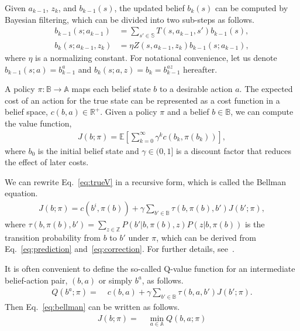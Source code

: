 \documentclass[letterpaper, 10 pt, conference]{ieeeconf}  %
\begin{document}
Given $a_{k-1}$, $z_k$, and $b_{k-1}(s)$,
the updated belief $b_k(s)$ can be computed by Bayesian filtering, which can be divided into two sub-steps as follows.
\begin{align}
  b_{k-1}(s; a_{k-1}) &= \sum_{s' \in \mathbb{S}} T(s, a_{k-1}, s') b_{k-1}(s),
  \label{eq:prediction}
  \\
  b_k(s; a_{k-1}, z_k) &= \eta Z(s, a_{k-1}, z_k) b_{k-1}(s; a_{k-1}),
  \label{eq:correction}
\end{align}
where $\eta$ is a normalizing constant.
For notational convenience, let us denote $b_{k-1}(s; a) = b_{k-1}^a$ and $b_k(s; a, z) = b_k = b_{k-1}^{a z}$ hereafter.

A policy $\pi : \mathbb{B} \rightarrow \mathbb{A}$ maps each belief state $b$ to a desirable action $a$.
The expected cost of an action for the true state can be represented as a cost function in a belief space, $c(b, a) \in \mathbb{R}^+$.
Given a policy $\pi$ and a belief $b \in \mathbb{B}$, we can compute the value function,
\begin{align}
  J(b; \pi) %
  = \mathbb{E} \left[ \sum_{k=0}^\infty \gamma^k c(b_k, \pi(b_k)) \right]\!,
  \label{eq:trueV}
\end{align}
where $b_0$ is the initial belief state and 	$\gamma \in (0, 1]$ is a discount factor that reduces the effect of later costs.


We can rewrite Eq.~\ref{eq:trueV} in a recursive form, which is called the Bellman equation.
\begin{align}
J(b; \pi) = c(b^i, \pi(b)) %
   + \gamma \sum_{b' \in \mathbb{B}} \tau(b, \pi(b), b') J(b'; \pi),
  \label{eq:bellman}
\end{align}
where $\tau(b, \pi(b), b') = \sum_{z \in \mathbb{Z}} P(b'|b,\pi(b),z) P(z|b,\pi(b))$ is the transition probability from $b$ to $b'$ under $\pi$,
which can be derived from Eq.~\ref{eq:prediction} and~\ref{eq:correction}.
For further details, see~\cite{Ross08}.

It is often convenient to define the so-called Q-value function for an intermediate belief-action pair, $(b, a)$ or simply $b^a$, as follows.
\begin{align}
  Q(b^a; \pi) =\; & c(b, a) + \gamma \sum_{b' \in \mathbb{B}} \tau(b, a, b') J(b'; \pi).
  \label{eq:qfunction}
\end{align}
Then Eq.~\ref{eq:bellman} can be written as follows.
\begin{align}
J(b; \pi) =\; & \min_{a \in \mathbb{A}} Q(b, a; \pi)
\label{eq:minq}
\end{align}
\end{document}
